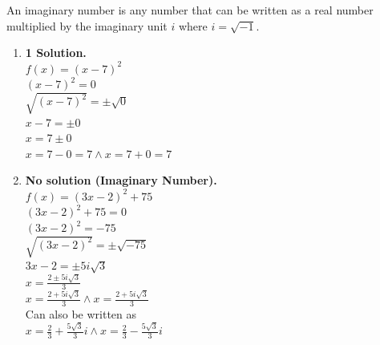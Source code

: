 \begin{definition}
  An imaginary number is any number that can be written as a real number multiplied by the imaginary unit $i$ where $i = \sqrt{-1}$.
\end{definition}

\begin{example}
  \hfill
  \begin{enumerate}
  \item \textbf{1 Solution.} \\
    $f(x) = (x - 7)^2$ \\
    $(x - 7)^2 = 0$ \\
    $\sqrt{(x - 7)^2} = \pm \sqrt{0}$ \\
    $x - 7 = \pm 0$ \\
    $x = 7 \pm 0$ \\
    $x = 7 - 0 = 7 \land x = 7 + 0 = 7$
  \item \textbf{No solution (Imaginary Number). }\\
    $f(x) = (3x - 2)^2 + 75$ \\
    $(3x - 2)^2 + 75 = 0$ \\
    $(3x - 2)^2 = -75$ \\
    $\sqrt{(3x - 2)^2} = \pm \sqrt{-75}$ \\
    $3x - 2 = \pm 5i\sqrt{3}$ \\
    $x = \frac{2 \pm 5i\sqrt{3}}{3}$ \\
    $x = \frac{2 + 5i\sqrt{3}}{3} \land x = \frac{2 + 5i\sqrt{3}}{3}$ \\
    Can also be written as \\
    $x = \frac{2}{3} + \frac{5\sqrt{3}}{3}i \land x = \frac{2}{3} - \frac{5\sqrt{3}}{3}i$
  \end{enumerate}
\end{example}
